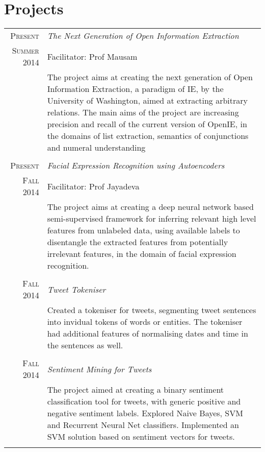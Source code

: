 \documentclass[a4paper,10pt]{article} %
\begin{document}
\section{Projects}

\begin{tabular}{r|p{11cm}}

\textsc{Present} & \emph{The Next Generation of Open Information Extraction}\\ 
\textsc{Summer 2014} & Facilitator: Prof Mausam \\ &\footnotesize{The project aims at creating the next generation of Open Information Extraction, a paradigm of IE, by the University of Washington, aimed at extracting arbitrary relations. The main aims of the project are increasing precision and recall of the current version of OpenIE, in  the domains of list extraction, semantics of conjunctions and numeral understanding }\\
\multicolumn{2}{c}{} \\


\textsc{Present} & \emph{Facial Expression Recognition using Autoencoders}\\ 
\textsc{Fall 2014} & Facilitator: Prof Jayadeva \\ & \footnotesize{The project aims at creating a deep neural network based semi-supervised framework for inferring relevant high level features from unlabeled data, using available labels to disentangle the extracted features from potentially irrelevant features, in the domain of facial expression recognition.}\\
\multicolumn{2}{c}{} \\


\textsc{Fall 2014}& \emph{Tweet Tokeniser}\\ 
 & \footnotesize{Created a tokeniser for tweets, segmenting tweet sentences into invidual tokens of words or entities. The tokeniser had additional features of normalising dates and time in the sentences as well.}\\
\multicolumn{2}{c}{} \\


\textsc{Fall 2014}& \emph{Sentiment Mining for Tweets}\\ 
 & \footnotesize{The project aimed at creating a binary sentiment classification tool for tweets, with generic positive and negative sentiment labels. Explored Naive Bayes, SVM and Recurrent Neural Net classifiers. Implemented an SVM solution based on sentiment vectors for tweets.}\\
\multicolumn{2}{c}{} \\


\end{tabular}
\end{document}
